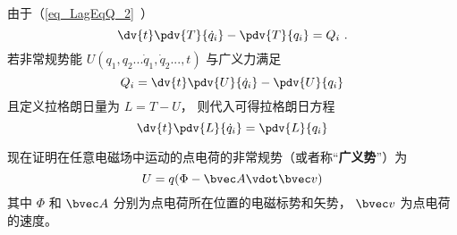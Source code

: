 
\begin{issues}
\issueDraft
\end{issues}


由于（\autoref{eq_LagEqQ_2}~）
\begin{equation}
\dv{t}\pdv{T}{\dot q_i} - \pdv{T}{q_i} = Q_i~.
\end{equation}
若非常规势能  $U(q_1, q_2...\dot q_1, \dot q_2..., t)$ 与广义力满足
\begin{equation}\label{eq_EMLagP_2}
Q_i = \dv{t} \pdv{U}{\dot q_i} - \pdv{U}{q_i}
\end{equation}
且定义拉格朗日量为 $L = T - U$， 则代入可得拉格朗日方程
\begin{equation}
\dv{t} \pdv{L}{\dot q_i} = \pdv{L}{q_i}
\end{equation}

现在证明在任意电磁场中运动的点电荷的非常规势（或者称“\textbf{广义势}”）为
\begin{equation}\label{eq_EMLagP_4}
U = q(\Phi  - \bvec A \vdot \bvec v)
\end{equation}
其中 $\Phi$ 和 $\bvec A$ 分别为点电荷所在位置的电磁标势和矢势， $\bvec v$ 为点电荷的速度。

